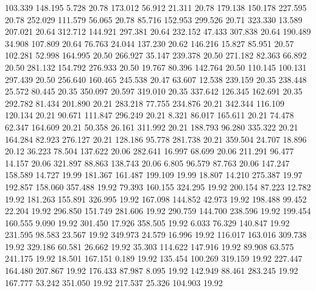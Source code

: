  103.339  148.195    5.728        20.78
 173.012   56.912   21.311        20.78
 179.138  150.178  227.595        20.78
 252.029  111.579   56.065        20.78
  85.716  152.953  299.526        20.71
 323.330   13.589  207.021        20.64
 312.712  144.921  297.381        20.64
 232.152   47.433  307.838        20.64
 190.489   34.908  107.809        20.64
  76.763   24.044  137.230        20.62
 146.216   15.827   85.951        20.57
 102.281   52.998  164.995        20.50
 266.927   35.147  239.378        20.50
 271.182   82.363   66.892        20.50
 281.132  154.792  276.933        20.50
  19.767   80.396  142.764        20.50
 110.145  100.131  297.439        20.50
 256.640  160.465  245.538        20.47
  63.607   12.538  239.159        20.35
 238.448   25.572   80.445        20.35
 350.097   20.597  319.010        20.35
 337.642  126.345  162.691        20.35
 292.782   81.434  201.890        20.21
 283.218   77.755  234.876        20.21
 342.344  116.109  120.134        20.21
  90.671  111.847  296.249        20.21
   8.321   86.017  165.611        20.21
  74.478   62.347  164.609        20.21
  50.358   26.161  311.992        20.21
 188.793   96.280  335.322        20.21
 164.284   82.923  276.127        20.21
 128.186   95.778  281.738        20.21
 359.504   24.707   18.896        20.12
  36.223   78.504  137.622        20.06
 282.641   16.997   68.699        20.06
 211.291   96.477   14.157        20.06
 321.897   88.863  138.743        20.06
   6.805   96.579   87.763        20.06
 147.247  158.589   14.727        19.99
 181.367  161.487  199.109        19.99
  18.807   14.210  275.387        19.97
 192.857  158.060  357.488        19.92
  79.393  160.155  324.295        19.92
 200.154   87.223   12.782        19.92
 181.263  155.891  326.995        19.92
 167.098  144.852   42.973        19.92
 198.488   99.452   22.204        19.92
 296.850  151.749  281.606        19.92
 290.759  144.700  238.596        19.92
 199.454  160.555    9.090        19.92
 301.450   17.926  358.505        19.92
   6.033   76.329  140.847        19.92
 231.595   98.583   23.567        19.92
 349.973   24.579   16.996        19.92
 116.017  163.016  309.738        19.92
 329.186   60.581   26.662        19.92
  35.303  114.622  147.916        19.92
  89.908   63.575  241.175        19.92
  18.501  167.151    0.189        19.92
 135.454  100.269  319.159        19.92
 227.447  164.480  207.867        19.92
 176.433   87.987    8.095        19.92
 142.949   88.461  283.245        19.92
 167.777   53.242  351.050        19.92
 217.537   25.326  104.903        19.92
